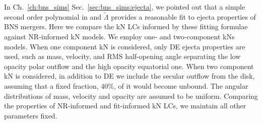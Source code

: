 

%
In Ch.~\ref{ch:bns_sims} Sec.~\ref{sec:bns_sims:ejecta}, we pointed out that a 
simple second order polynomial in \mr{} and $\tilde{\Lambda}$ provides a reasonable fit to 
ejecta properties of \ac{BNS} mergers. 
%
%
%
%
Here we compare the \ac{kN} \acp{LC} informed by these fitting 
formulae against \ac{NR}-informed \ac{kN} models. 
We employ one- and two-component \acp{kN} models. 
%
%
When one component \ac{kN} is considered, only \ac{DE} ejecta properties are used, 
such as mass, velocity, and \ac{RMS} half-opening angle separating the low opacity 
polar outflow and the high opacity equatorial one. 
When two component \ac{kN} is considered, in addition to \ac{DE} we include the 
secular outflow from the disk, assuming that a fixed fraction, $40\%$, of it would 
become unbound. 
%
The angular distributions of mass, velocity and opacity
are assumed to be uniform. 
Comparing the properties of \ac{NR}-informed and fit-informed \ac{kN} \acp{LC}, we 
maintain all other parameters fixed.
%


